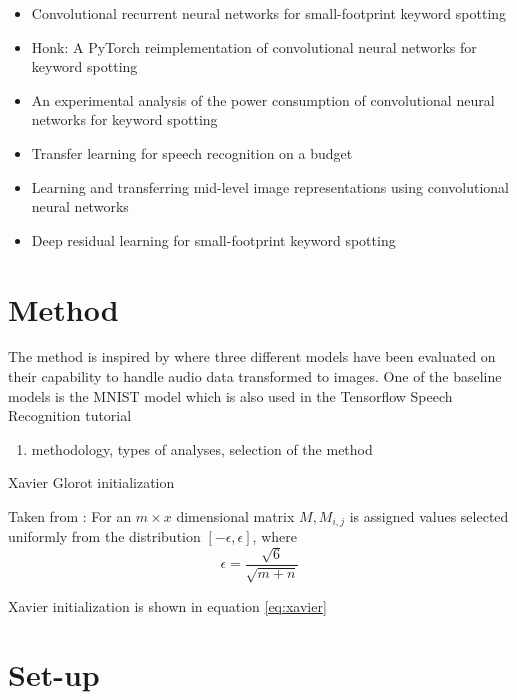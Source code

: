 \documentclass{article}
\theoremstyle{definition}
\theoremstyle{remark}
\begin{document}
\begin{itemize}
	\item Convolutional recurrent neural networks for small-footprint keyword spotting \cite{arik2017convolutional}
	\item Honk: A PyTorch reimplementation of convolutional neural networks for keyword spotting \cite{tang2017honk}
	\item An experimental analysis of the power consumption of convolutional neural networks for keyword spotting \cite{tang2018experimental}
	\item Transfer learning for speech recognition on a budget \cite{kunze2017transfer}
	\item Learning and transferring mid-level image representations using convolutional neural networks \cite{oquab2014learning}
	\item Deep residual learning for small-footprint keyword spotting \cite{tang2018deep}
\end{itemize}




\section{Method}

The method is inspired by \cite{gouda2018speech} where three different models have been evaluated on their capability to handle audio data transformed to images. One of the baseline models is the MNIST model which is also used in the Tensorflow Speech Recognition tutorial \cite{tutorial}


\begin{enumerate}
	\item methodology, types of analyses, selection of the method
\end{enumerate}


Xavier Glorot initialization \cite{glorot2010understanding}

Taken from \cite{gouda2018speech}: For an $m \times x$ dimensional matrix $M, M_{i,j}$ is assigned values selected uniformly from the distribution $[-\epsilon, \epsilon]$, where
\begin{equation} \label{eq:xavier}
\epsilon = \frac{\sqrt{6}}{\sqrt{m + n}}
\end{equation}


Xavier initialization is shown in equation \ref{eq:xavier}



\section{Set-up}
\end{document}
